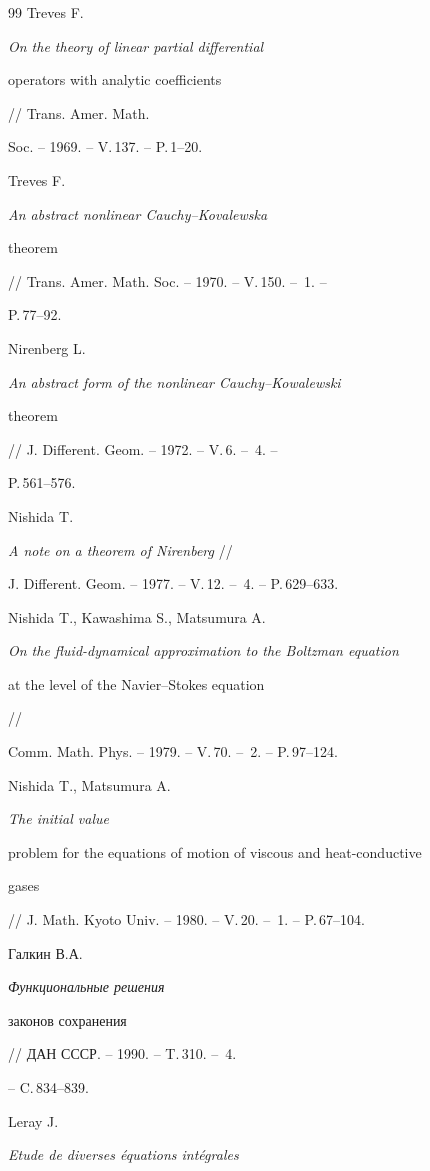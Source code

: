 \begin{thebibliography}{99}
 Treves F.


{\em On the theory of linear partial differential


operators with analytic coefficients} // Trans. Amer. Math.


Soc. -- 1969. -- V.\,137. -- P.\,1--20.




Treves F.


{\em An abstract nonlinear Cauchy--Kovalewska


theorem} // Trans. Amer. Math. Soc. -- 1970. -- V.\,150. -- \No\,1. --


P.\,77--92.


 Nirenberg L.


{\em An abstract form of the nonlinear Cauchy--Kowalewski


theorem} // J. Different. Geom. -- 1972. -- V.\,6. -- \No\,4. --


P.\,561--576.


 Nishida T.


{\em A note on a theorem of Nirenberg} //


J. Different. Geom. -- 1977. -- V.\,12. -- \No\,4. -- P.\,629--633.




Nishida T., Kawashima S., Matsumura A.


{\em On the fluid-dynamical approximation to the Boltzman equation


at the level of the Navier--Stokes equation} //


Comm. Math. Phys. -- 1979. -- V.\,70. -- \No\,2. -- P.\,97--124.




Nishida T., Matsumura A.


{\em The initial value


problem for the equations of motion of viscous and heat-conductive


gases} // J. Math. Kyoto Univ. -- 1980. -- V.\,20. -- \No\,1. -- P.\,67--104.




Галкин В.А. {\em Функциональные решения


законов сохранения} // ДАН СССР. -- 1990. -- T.\,310. -- \No\,4.


-- C.\,834--839.




Leray J. {\em Etude de diverses \'{e}quations int\'{e}grales


}
\end{thebibliography}
